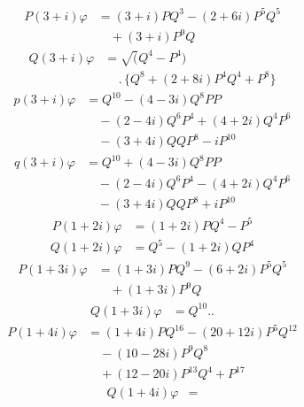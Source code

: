 \[
\begin{aligned}P(3+i)\varphi&=(3+i)PQ^3-(2+6i)P^5Q^5\\[5pt]&\quad{}+(3+i)P^9Q\end{aligned}
\]
\[
\begin{aligned}Q(3+i)\varphi&=\surd(Q^4-P^4)\\[5pt]&\quad{}\, .\,\{Q^8+(2+8i)P^4Q^4+P^8\}\end{aligned}
\]
\[
\begin{aligned}p(3+i)\varphi&=Q^{10}-(4-3i)Q^8PP\\[5pt]&\quad{}-(2-4i)Q^6P^4+(4+2i)Q^4P^6\\[5pt]&\quad{}-(3+4i)QQP^8-iP^{10}\end{aligned}
\]
\[
\begin{aligned}q(3+i)\varphi&=Q^{10}+(4-3i)Q^8PP\\[5pt]&\quad{}-(2-4i)Q^6P^4-(4+2i)Q^4P^6\\[5pt]&\quad{}-(3+4i)QQP^8+iP^{10}\end{aligned}
\]
\[
\begin{aligned}P(1+2i)\varphi&=(1+2i)PQ^4-P^5\end{aligned}
\]
\[
\begin{aligned}Q(1+2i)\varphi&=Q^5-(1+2i)QP^4\end{aligned}
\]
\[
\begin{aligned}P(1+3i)\varphi&=(1+3i)PQ^9-(6+2i)P^5Q^5\\[5pt]&\quad{}+(1+3i)P^9Q\end{aligned}
\]
\[
\begin{aligned}Q(1+3i)\varphi&=Q^{10}\mathord{.}\mathord{.}\end{aligned}
\]
\[
\begin{aligned}P(1+4i)\varphi&=(1+4i)PQ^{16}-(20+12i)P^5Q^{12}\\[5pt]&\quad{}-(10-28i)P^9Q^8\\[5pt]&\quad{}+(12-20i)P^{13}Q^4+P^{17}\end{aligned}
\]
\[
\begin{aligned}Q(1+4i)\varphi&=\end{aligned}
\]

